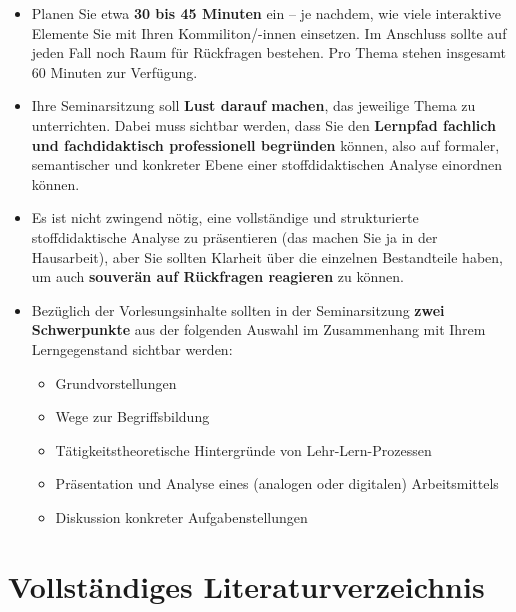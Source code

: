 \documentclass[
  ngerman,
]{scrbook}
\providecommand{\tightlist}{%
  \setlength{\itemsep}{0pt}\setlength{\parskip}{0pt}}
\theoremstyle{definition}
\theoremstyle{definition}
\theoremstyle{definition}
\theoremstyle{definition}
\theoremstyle{remark}
\begin{document}
\begin{itemize}
\tightlist
\item
  Planen Sie etwa \textbf{30 bis 45 Minuten} ein -- je nachdem, wie viele interaktive Elemente Sie mit Ihren Kommiliton/-innen einsetzen. Im Anschluss sollte auf jeden Fall noch Raum für Rückfragen bestehen. Pro Thema stehen insgesamt 60 Minuten zur Verfügung.
\item
  Ihre Seminarsitzung soll \textbf{Lust darauf machen}, das jeweilige Thema zu unterrichten. Dabei muss sichtbar werden, dass Sie den \textbf{Lernpfad fachlich und fachdidaktisch professionell begründen} können, also auf formaler, semantischer und konkreter Ebene einer stoffdidaktischen Analyse einordnen können.
\item
  Es ist nicht zwingend nötig, eine vollständige und strukturierte stoffdidaktische Analyse zu präsentieren (das machen Sie ja in der Hausarbeit), aber Sie sollten Klarheit über die einzelnen Bestandteile haben, um auch \textbf{souverän auf Rückfragen reagieren} zu können.
\item
  Bezüglich der Vorlesungsinhalte sollten in der Seminarsitzung \textbf{zwei Schwerpunkte} aus der folgenden Auswahl im Zusammenhang mit Ihrem Lerngegenstand sichtbar werden:

  \begin{itemize}
  \tightlist
  \item
    Grundvorstellungen
  \item
    Wege zur Begriffsbildung
  \item
    Tätigkeitstheoretische Hintergründe von Lehr-Lern-Prozessen
  \item
    Präsentation und Analyse eines (analogen oder digitalen) Arbeitsmittels
  \item
    Diskussion konkreter Aufgabenstellungen
  \end{itemize}
\end{itemize}

\hypertarget{vollstuxe4ndiges-literaturverzeichnis}{%
\chapter*{Vollständiges Literaturverzeichnis}\label{vollstuxe4ndiges-literaturverzeichnis}}
\end{document}
